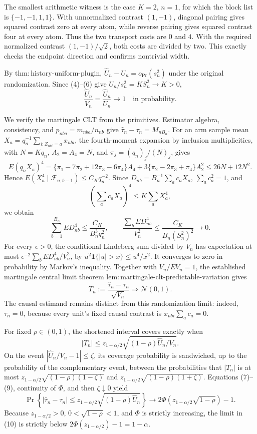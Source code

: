 The smallest arithmetic witness is the case \(K=2\), \(n=1\), for which the block list is \(\{-1,-1,1,1\}\). With unnormalized contrast \((1,-1)\), diagonal pairing gives squared contrast zero at every atom, while reverse pairing gives squared contrast four at every atom. Thus the two transport costs are \(0\) and \(4\). With the required normalized contrast \((1,-1)/\sqrt2\), both costs are divided by two. This exactly checks the endpoint direction and confirms nontrivial width.

By \(\mathrm{thm:history\text{-}uniform\text{-}plugin}\),
\(\widehat U_n-U_n=o_{\Pr}(s_n^2)\) under the original randomization. Since (4)--(6) give \(U_n/s_n^2=KS_n^2\to K>0\),
\[
\frac{\widehat U_n}{V_n}=\frac{\widehat U_n}{U_n}\longrightarrow1
\quad\text{in probability}.
\tag{7}
\]

We verify the martingale CLT from the primitives. Estimator algebra, consistency, and \(p_{nba}=m_{nba}/n_{nb}\) give \(\widehat\tau_n-\tau_n=M_{nB_n}\). For an arm sample mean
\(X_a=q_n^{-1}\sum_{i:Z_{nbi}=a}x_{nbi}\), the fourth-moment expansion by inclusion multiplicities, with \(N=Kq_n\), \(A_2=A_4=N\), and \(\pi_j=(q_n)_j/(N)_j\), gives
\[
E(q_nX_a)^4
=\{\pi_1-7\pi_2+12\pi_3-6\pi_4\}A_4
+3\{\pi_2-2\pi_3+\pi_4\}A_2^2
\le26N+12N^2.
\]
Hence \(E(X_a^4\mid\mathcal F_{n,b-1})\le C_Kq_n^{-2}\). Since
\(D_{nb}=B_n^{-1}\sum_ac_aX_a\), \(\sum_ac_a^2=1\), and
\[
\left(\sum_ac_aX_a\right)^4\le K\sum_aX_a^4,
\]
we obtain
\[
\sum_{b=1}^{B_n}ED_{nb}^4
\le\frac{C_K}{B_n^3q_n^2},
\qquad
\frac{\sum_bED_{nb}^4}{V_n^2}
\le\frac{C_K}{B_n(S_n^2)^2}\longrightarrow0.
\tag{8}
\]
For every \(\epsilon>0\), the conditional Lindeberg sum divided by \(V_n\) has expectation at most \(\epsilon^{-2}\sum_bED_{nb}^4/V_n^2\), by \(u^2\mathbf1\{|u|>x\}\le u^4/x^2\). It converges to zero in probability by Markov's inequality. Together with \(V_n/EV_n=1\), the established martingale central limit theorem \(\mathrm{lem:martingale\text{-}clt\text{-}predictable\text{-}variation}\) gives
\[
T_n:=\frac{\widehat\tau_n-\tau_n}{\sqrt{V_n}}
\Rightarrow\mathcal N(0,1).
\tag{9}
\]
The causal estimand remains distinct from this randomization limit: indeed, \(\tau_n=0\), because every unit's fixed causal contrast is \(x_{nbi}\sum_ac_a=0\).

For fixed \(\rho\in(0,1)\), the shortened interval covers exactly when
\[
|T_n|\le z_{1-\alpha/2}
\sqrt{(1-\rho)\widehat U_n/V_n}.
\]
On the event \(|\widehat U_n/V_n-1|\le\zeta\), its coverage probability is sandwiched, up to the probability of the complementary event, between the probabilities that \(|T_n|\) is at most \(z_{1-\alpha/2}\sqrt{(1-\rho)(1-\zeta)}\) and \(z_{1-\alpha/2}\sqrt{(1-\rho)(1+\zeta)}\). Equations (7)--(9), continuity of \(\Phi\), and then \(\zeta\downarrow0\) yield
\[
\Pr\!\left\{|\widehat\tau_n-\tau_n|\le z_{1-\alpha/2}
\sqrt{(1-\rho)\widehat U_n}\right\}
\longrightarrow
2\Phi\!\left(z_{1-\alpha/2}\sqrt{1-\rho}\right)-1.
\tag{10}
\]
Because \(z_{1-\alpha/2}>0\), \(0<\sqrt{1-\rho}<1\), and \(\Phi\) is strictly increasing, the limit in (10) is strictly below \(2\Phi(z_{1-\alpha/2})-1=1-\alpha\).

